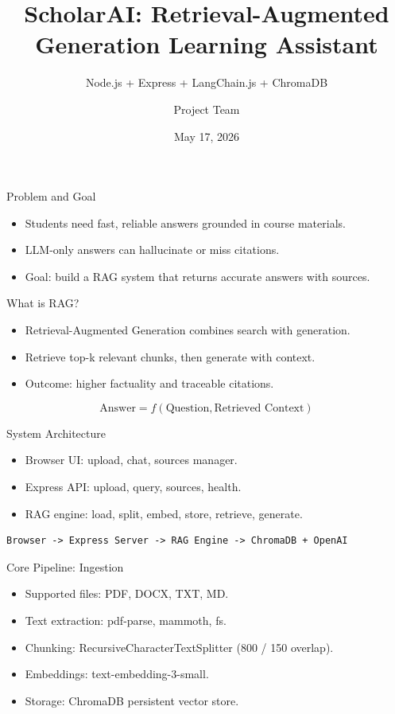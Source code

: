 \documentclass[aspectratio=169]{beamer}
\title{ScholarAI: Retrieval-Augmented Generation Learning Assistant}
\subtitle{Node.js + Express + LangChain.js + ChromaDB}
\author{Project Team}
\date{May 17, 2026}
\begin{document}
\begin{frame}
  \titlepage
\end{frame}

\begin{frame}{Problem and Goal}
  \begin{itemize}
    \item Students need fast, reliable answers grounded in course materials.
    \item LLM-only answers can hallucinate or miss citations.
    \item Goal: build a RAG system that returns accurate answers with sources.
  \end{itemize}
\end{frame}

\begin{frame}{What is RAG?}
  \begin{itemize}
    \item Retrieval-Augmented Generation combines search with generation.
    \item Retrieve top-k relevant chunks, then generate with context.
    \item Outcome: higher factuality and traceable citations.
  \end{itemize}
  \vspace{6pt}
  $$\text{Answer} = f(\text{Question}, \text{Retrieved Context})$$
\end{frame}

\begin{frame}{System Architecture}
  \begin{itemize}
    \item Browser UI: upload, chat, sources manager.
    \item Express API: upload, query, sources, health.
    \item RAG engine: load, split, embed, store, retrieve, generate.
  \end{itemize}
  \vspace{4pt}
  \small
  \begin{verbatim}
Browser -> Express Server -> RAG Engine -> ChromaDB + OpenAI
  \end{verbatim}
\end{frame}

\begin{frame}{Core Pipeline: Ingestion}
  \begin{itemize}
    \item Supported files: PDF, DOCX, TXT, MD.
    \item Text extraction: pdf-parse, mammoth, fs.
    \item Chunking: RecursiveCharacterTextSplitter (800 / 150 overlap).
    \item Embeddings: text-embedding-3-small.
    \item Storage: ChromaDB persistent vector store.
  \end{itemize}
\end{frame}
\end{document}
